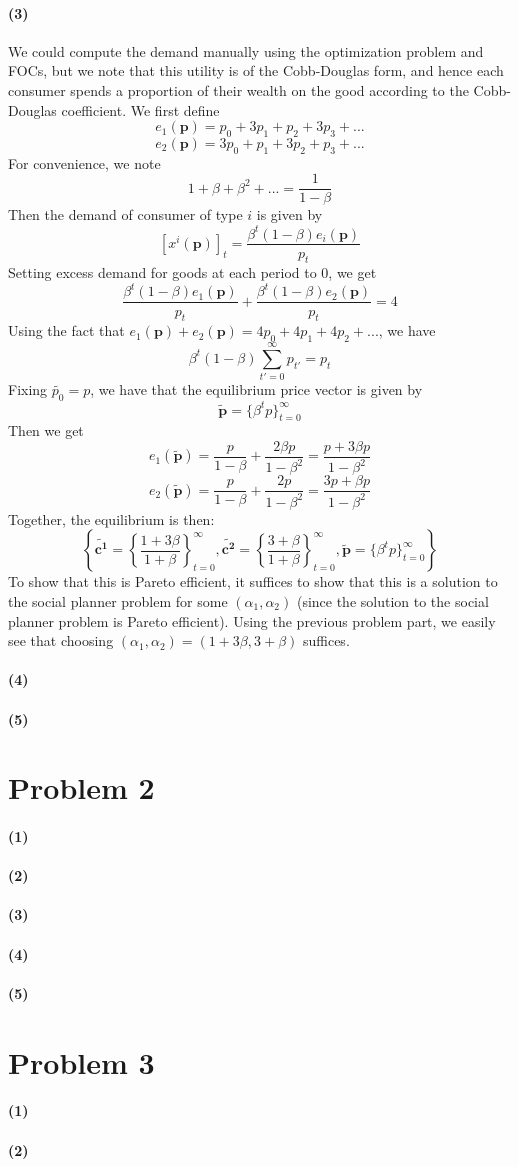 \documentclass[10pt,letter]{article}
\renewcommand{\vector}[1]{\boldsymbol{#1}}
\newcommand{\problem}[1]{\section*{Problem #1}}
\newcommand{\problempart}[1]{\paragraph{#1}}
\begin{document}
\problempart{(3)}
We could compute the demand manually using the optimization problem and FOCs, but we note that this utility is of the Cobb-Douglas form, and hence each consumer spends a proportion of their wealth on the good according to the Cobb-Douglas coefficient. We first define
\[ e_1(\vector{p}) = p_0 + 3p_1 + p_2 + 3p_3 + ...  \]
\[ e_2(\vector{p}) = 3p_0 + p_1 + 3p_2 + p_3 + ...  \]
For convenience, we note
\[ 1 + \beta + \beta^2 + ... = \frac{1}{1-\beta}  \]
Then the demand of consumer of type $i$ is given by
\[ [x^i(\vector{p})]_t = \frac{\beta^t(1-\beta)e_i(\vector{p})}{p_t} \]
Setting excess demand for goods at each period to 0, we get
\[ \frac{\beta^t(1-\beta)e_1(\vector{p})}{p_t} + \frac{\beta^t(1-\beta)e_2(\vector{p})}{p_t} = 4 \]
Using the fact that $e_1(\vector{p}) + e_2(\vector{p}) = 4p_0 + 4p_1 + 4p_2 + ...$, we have
\[ \beta^t(1-\beta)\sum_{t'=0}^\infty p_{t'} = p_t \]
Fixing $\tilde{p_0} = p$, we have that the equilibrium price vector is given by
\[\vector{\tilde{p}} = \{ \beta^t p \}_{t=0}^\infty \]
Then we get
\[ e_1(\vector{\tilde{p}}) = \frac{p}{1-\beta} + \frac{2\beta p}{1-\beta^2} = \frac{p + 3\beta p}{1-\beta^2} \]
\[ e_2(\vector{\tilde{p}}) = \frac{p}{1-\beta} + \frac{2p}{1-\beta^2} = \frac{3p + \beta p}{1-\beta^2} \]
Together, the equilibrium is then:
\[ \left\{\vector{\tilde{c^1}} = \left\{\frac{1+3\beta }{1+\beta} \right\}_{t=0}^\infty, \vector{\tilde{c^2}} = \left\{\frac{3+\beta }{1+\beta} \right\}_{t=0}^\infty, \vector{\tilde{p}} =\{ \beta^t p \}_{t=0}^\infty \right\} \]
To show that this is Pareto efficient, it suffices to show that this is a solution to the social planner problem for some $(\alpha_1, \alpha_2)$ (since the solution to the social planner problem is Pareto efficient). Using the previous problem part, we easily see that choosing $(\alpha_1, \alpha_2) = (1+3\beta, 3+\beta)$ suffices.
\problempart{(4)}
\problempart{(5)}

\problem{2}
\problempart{(1)}
\problempart{(2)}
\problempart{(3)}
\problempart{(4)}
\problempart{(5)}

\problem{3}
\problempart{(1)}
\problempart{(2)}
\end{document}
